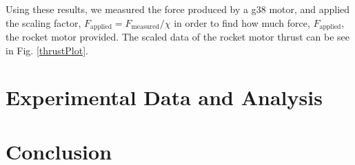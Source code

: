 \documentclass[aps,pra,twocolumn]{revtex4-1}
\begin{document}
Using these results, we measured the force produced by a g38 motor, and applied the scaling factor, $F_\text{applied} = F_\text{measured}/\chi$ in order to find how much force, $F_\text{applied}$, the rocket motor provided.  The scaled data of the rocket motor thrust can be see in Fig. \ref{thrustPlot}. 



\section{\label{section 4} Experimental Data and Analysis}




\section{\label{section 5} Conclusion}



\end{document}
